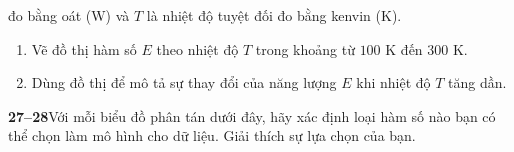 
\noindent
\begin{minipage}[t]{0.485\textwidth}
    \fontsize{9pt}{12.5pt}\selectfont
    \noindent đo bằng oát (W) và $T$ là nhiệt độ tuyệt đối đo bằng kenvin (K).
    \begin{enumerate}[label=\textbf{(\alph*)}, leftmargin=*, itemsep=1pt, topsep=2pt]
        \item Vẽ đồ thị hàm số $E$ theo nhiệt độ $T$ trong khoảng từ $100\text{ K}$ đến $300\text{ K}$.
        \item Dùng đồ thị để mô tả sự thay đổi của năng lượng $E$ khi nhiệt độ $T$ tăng dần.
    \end{enumerate}

    \vspace{6pt}
    \noindent\textbf{\color{stewartcyan}27--28}\quad Với mỗi biểu đồ phân tán dưới đây, hãy xác định loại hàm số nào bạn có thể chọn làm mô hình cho dữ liệu. Giải thích sự lựa chọn của bạn.


\end{minipage}
